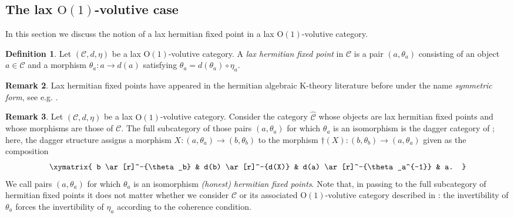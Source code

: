 \documentclass{article}
\newcommand{\Oone}{\operatorname{O(1)}}
\newcommand{\C}{\mathcal{C}}
\numberwithin{equation}{section}
\theoremstyle{definition}
\newtheorem{definition}{Definition}[subsection]
\newtheorem{remark}[definition]{Remark}
\theoremstyle{theorem}
\begin{document}
\subsection{The lax $\Oone$-volutive case}
In this section we discuss the notion of a lax hermitian fixed point in a lax $\Oone$-volutive category.
\begin{definition}
    Let $(\C,d,\eta)$ be a lax $\Oone$-volutive category. A \emph{lax hermitian fixed point} in $\C$ is a pair $(a,\theta_a)$ consisting 
    of an object $a \in \C$ and a morphism $\theta_a \colon a \to d(a)$ satisfying $\theta_a = d(\theta_a) \circ \eta_a$. 
\end{definition}
\begin{remark}
    Lax hermitian fixed points have appeared in the hermitian algebraic K-theory literature before under the name 
    \emph{symmetric form}, see e.g. \cite[Section 3]{Schlichting2010}.
\end{remark}
\begin{remark}\label{Remark: hermitian fixed points of a lax Oone volutive category}
    Let $(\C,d,\eta)$ be a lax $\Oone$-volutive category. Consider the category $\hat{\C}$ whose objects are lax hermitian fixed points 
    and whose morphisms are those of $\C$. The full subcategory of those pairs $(a,\theta_a)$ for which $\theta_a$ is an isomorphism is the dagger category 
    of ; here, the dagger structure assigns a morphism $X \colon (a,\theta_a) \to (b,\theta_b)$ to 
    the morphism $\dagger(X) \colon (b,\theta_b) \to (a,\theta_a)$ given as the composition 
    \begin{equation}
        \xymatrix{
            b \ar[r]^-{\theta_b} & d(b) \ar[r]^-{d(X)} & d(a) \ar[r]^-{\theta_a^{-1}} & a.
        }
    \end{equation}
    We call pairs $(a,\theta_a)$ for which $\theta_a$ is an isomorphism \emph{(honest) hermitian fixed points}. Note that, in passing to the full subcategory of hermitian fixed points it does not matter whether we consider $\C$ or 
    its associated $\Oone$-volutive category described in : the invertibility of $\theta_a$ forces 
    the invertibility of $\eta_a$ according to the coherence condition. 
\end{remark}
\end{document}
